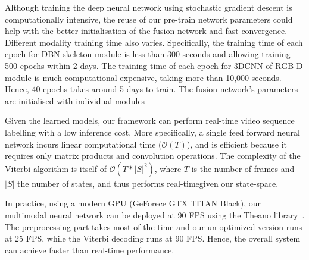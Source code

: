 Although training the deep neural network using stochastic gradient descent is computationally intensive, the reuse of our pre-train network parameters could help with the better initialisation of the fusion network and fast convergence. Different modality training time also varies. Specifically, the training time of each epoch for DBN skeleton module is less than 300 seconds and allowing training 500 epochs within 2 days. The training time of each epoch for 3DCNN of RGB-D  module is much computational expensive, taking more than 10,000 seconds. Hence, 40 epochs takes around 5 days to train. The fusion network's parameters are initialised with individual modules

%
Given the learned models,  our framework can perform real-time video sequence labelling with a low inference cost.
%
More specifically, a single feed forward neural network incurs linear computational time ($\mathcal{O}(T)$),
and is efficient because it requires only matrix products and convolution operations.
The complexity of the Viterbi algorithm is itself of $\mathcal{O} (T* |S|^2)$, where
$T$ is the number of frames and $|S|$ the number of states, and thus performs real-timegiven our state-space.

In practice, using a modern GPU (GeForece GTX TITAN Black), our multimodal neural network can be deployed at 90 FPS using the
Theano library~\cite{Bastien-Theano-2012}.
The preprocessing part takes most of the time and our un-optimized version runs at 25 FPS, while the
 Viterbi decoding  runs at 90 FPS. Hence, the overall system can achieve faster than real-time performance.





\endinput
